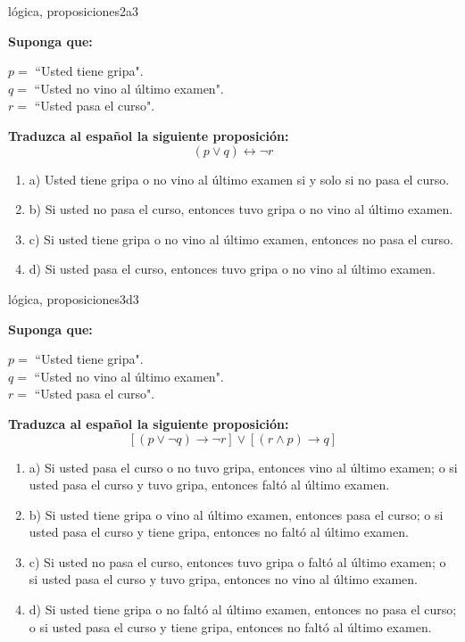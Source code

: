 \documentclass{article}
\begin{document}
\begin{question}{13}{lógica, proposiciones}{2}{a}{3}{
\textbf{Suponga que:} \smallskip

\(p = \) ``Usted tiene gripa".\\
\(q = \) ``Usted no vino al último examen".\\
\(r = \) ``Usted pasa el curso". \smallskip

\textbf{Traduzca al español la siguiente proposición:}
\[
(p \lor q) \leftrightarrow \neg r
\]

\begin{enumerate}
   \item a) Usted tiene gripa o no vino al último examen si y solo si no pasa el curso.  
   \item b) Si usted no pasa el curso, entonces tuvo gripa o no vino al último examen.  
   \item c) Si usted tiene gripa o no vino al último examen, entonces no pasa el curso.  
   \item d) Si usted pasa el curso, entonces tuvo gripa o no vino al último examen.  
\end{enumerate}
}
\end{question}

\begin{question}{14}{lógica, proposiciones}{3}{d}{3}{
\textbf{Suponga que:} \smallskip

\(p = \) ``Usted tiene gripa".\\
\(q = \) ``Usted no vino al último examen".\\
\(r = \) ``Usted pasa el curso". \smallskip

\textbf{Traduzca al español la siguiente proposición:}
\[
[(p \lor \neg q) \rightarrow \neg r] \lor [(r \land p) \rightarrow q]
\]

\begin{enumerate}
   \item a) Si usted pasa el curso o no tuvo gripa, entonces vino al último examen; o si usted pasa el curso y tuvo gripa, entonces faltó al último examen.  
   \item b) Si usted tiene gripa o vino al último examen, entonces pasa el curso; o si usted pasa el curso y tiene gripa, entonces no faltó al último examen.  
   \item c) Si usted no pasa el curso, entonces tuvo gripa o faltó al último examen; o si usted pasa el curso y tuvo gripa, entonces no vino al último examen.  
   \item d) Si usted tiene gripa o no faltó al último examen, entonces no pasa el curso; o si usted pasa el curso y tiene gripa, entonces no faltó al último examen.
\end{enumerate}
}
\end{question}
\end{document}
